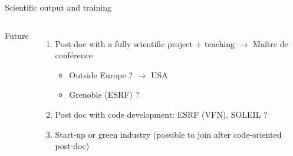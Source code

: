 \begin{frame}{Scientific output and training}
\begin{columns}
        \pause
        \textcolor{Prune}{Future}
        \begin{enumerate}
            \item Post-doc with a fully scientific project $+$ teaching $\rightarrow$ Maître de conférence
            \begin{itemize}
                \item Outside Europe ? $\rightarrow$ USA
                \item Grenoble (ESRF) ?
            \end{itemize}
            \item Post doc with code development: ESRF (VFN), SOLEIL ?
            \item Start-up or green industry (possible to join after code-oriented post-doc)
        \end{enumerate}
    \end{columns}
    
\end{frame}